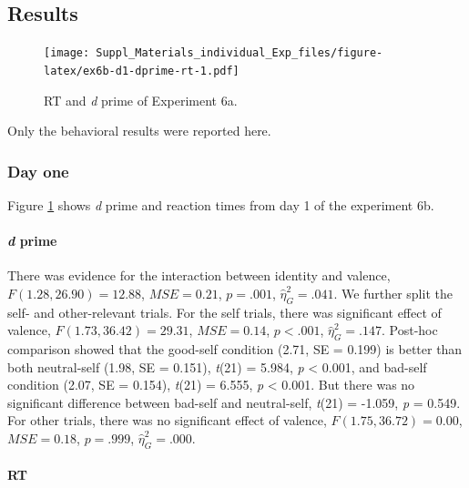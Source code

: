 \documentclass[
  english,
  man]{apa6}
\let\oldparagraph\paragraph
\renewcommand{\paragraph}[1]{\oldparagraph{#1}\mbox{}}
\begin{document}
\hypertarget{results-10}{%
\subsection{Results}\label{results-10}}

\begin{figure}
\centering
\texttt{[image: Suppl\_Materials\_individual\_Exp\_files/figure-latex/ex6b-d1-dprime-rt-1.pdf]}
\caption{\label{fig:ex6b-d1-dprime-rt}RT and \emph{d} prime of Experiment 6a.}
\end{figure}

Only the behavioral results were reported here.

\hypertarget{day-one}{%
\subsubsection{Day one}\label{day-one}}

Figure \ref{fig:ex6b-d1-dprime-rt} shows \emph{d} prime and reaction times from day 1 of the experiment 6b.

\hypertarget{d-prime-8}{%
\paragraph{\texorpdfstring{\emph{d} prime}{d prime}}\label{d-prime-8}}

There was evidence for the interaction between identity and valence, \(F(1.28, 26.90) = 12.88\), \(\mathit{MSE} = 0.21\), \(p = .001\), \(\hat{\eta}^2_G = .041\). We further split the self- and other-relevant trials. For the self trials, there was significant effect of valence, \(F(1.73, 36.42) = 29.31\), \(\mathit{MSE} = 0.14\), \(p < .001\), \(\hat{\eta}^2_G = .147\). Post-hoc comparison showed that the good-self condition (2.71, SE = 0.199) is better than both neutral-self (1.98, SE = 0.151), \emph{t}(21) = 5.984, \emph{p} \textless{} 0.001, and bad-self condition (2.07, SE = 0.154), \emph{t}(21) = 6.555, \emph{p} \textless{} 0.001. But there was no significant difference between bad-self and neutral-self, \emph{t}(21) = -1.059, \emph{p} = 0.549. For other trials, there was no significant effect of valence, \(F(1.75, 36.72) = 0.00\), \(\mathit{MSE} = 0.18\), \(p = .999\), \(\hat{\eta}^2_G = .000\).

\hypertarget{rt}{%
\paragraph{RT}\label{rt}}
\end{document}
